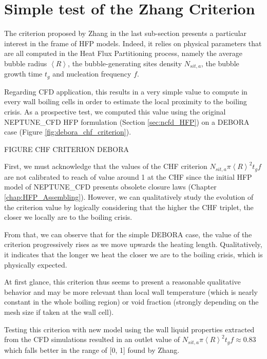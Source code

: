 \section{Simple test of the Zhang Criterion}

The criterion proposed by Zhang in the last sub-section presents a particular interest in the frame of HFP models. Indeed, it relies on physical parameters that are all computed in the Heat Flux Partitioning process, namely the average bubble radius $\left<R\right>$, the bubble-generating sites density $N_{sit,a}$, the bubble growth time  $t_{g}$ and nucleation frequency $f$. 

\npar

Regarding CFD application, this results in a very simple value to compute in every wall boiling cells in order to estimate the local proximity to the boiling crisis. As a prospective test, we computed this value using the original NEPTUNE\_CFD HFP formulation (Section \ref{sec:ncfd_HFP}) on a DEBORA case (Figure \ref{fig:debora_chf_criterion}).

FIGURE CHF CRITERION DEBORA


\npar

First, we must acknowledge that the values of the CHF criterion $N_{sit,a} \pi \left<R\right>^{2} t_{g}f$ are not calibrated to reach of value around 1 at the CHF since the initial HFP model of NEPTUNE\_CFD presents obsolete closure laws (Chapter \ref{chap:HFP_Assembling}). However, we can qualitatively study the evolution of the criterion value by logically considering that the higher the CHF triplet, the closer we locally are to the boiling crisis.

\npar

From that, we can observe that for the simple DEBORA case, the value of the criterion progressively rises as we move upwards the heating length. Qualitatively, it indicates that the longer we heat the closer we are to the boiling crisis, which is physically expected. 

\npar

At first glance, this criterion thus seems to present a reasonable qualitative behavior and may be more relevant than local wall temperature (which is nearly constant in the whole boiling region) or void fraction (strongly depending on the mesh size if taken at the wall cell).

\begin{remark*}{}
Testing this criterion with new model using the wall liquid properties extracted from the CFD simulations resulted in an outlet value of $N_{sit,a} \pi \left<R\right>^{2} t_{g}f \approx 0.83$ which falls better in the range of [0, 1] found by Zhang.
\end{remark*}


